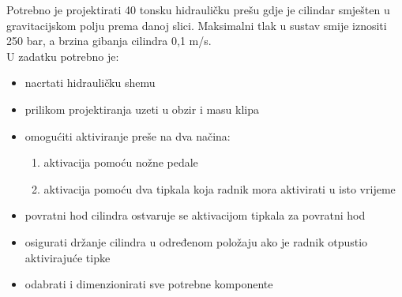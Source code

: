 \documentclass[zadatak]{FSBtex}
\begin{document}
\begin{SeminarskiZadatak}[]
Potrebno je projektirati 40 tonsku hidrauličku prešu gdje je cilindar smješten u gravitacijskom polju prema danoj slici. Maksimalni tlak u sustav smije iznositi 250 bar, a brzina gibanja cilindra 0,1 m/s.\\

\noindent U zadatku potrebno je:
\begin{itemize}
\setlength\itemsep{-.25em}
\item nacrtati hidrauličku shemu

\item prilikom projektiranja uzeti u obzir i masu klipa

\item omogućiti aktiviranje preše na dva načina:
\begin{enumerate}
\item aktivacija pomoću nožne pedale
\item aktivacija pomoću dva tipkala koja radnik mora aktivirati u isto vrijeme
\end{enumerate}

\item povratni hod cilindra ostvaruje se aktivacijom tipkala za povratni hod

\item osigurati držanje cilindra u određenom položaju ako je radnik otpustio aktivirajuće tipke
\item odabrati i dimenzionirati sve potrebne komponente
\end{itemize}

\end{SeminarskiZadatak}
\end{document}
